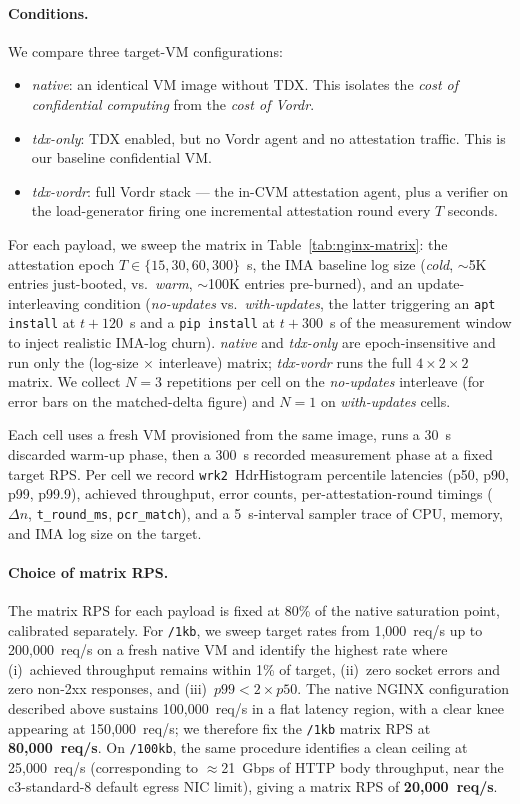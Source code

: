 \paragraph{Conditions.}
We compare three target-VM configurations:
\begin{itemize}
\item \emph{native}: an identical VM image without TDX. This isolates
  the \emph{cost of confidential computing} from the \emph{cost of
  Vordr}.
\item \emph{tdx-only}: TDX enabled, but no Vordr agent and no
  attestation traffic. This is our baseline confidential VM.
\item \emph{tdx-vordr}: full Vordr stack — the in-CVM attestation
  agent, plus a verifier on the load-generator firing one incremental
  attestation round every $T$ seconds.
\end{itemize}

For each payload, we sweep the matrix in
Table~\ref{tab:nginx-matrix}: the attestation epoch $T \in \{15, 30,
60, 300\}$~s, the IMA baseline log size (\emph{cold}, $\sim$5K entries
just-booted, vs.~\emph{warm}, $\sim$100K entries pre-burned), and an
update-interleaving condition (\emph{no-updates} vs.~\emph{with-updates},
the latter triggering an \texttt{apt install} at $t{+}120$~s and a
\texttt{pip install} at $t{+}300$~s of the measurement window to
inject realistic IMA-log churn). \emph{native} and \emph{tdx-only}
are epoch-insensitive and run only the (log-size $\times$ interleave)
matrix; \emph{tdx-vordr} runs the full $4 \times 2 \times 2$ matrix.
We collect $N{=}3$ repetitions per cell on the \emph{no-updates} interleave
(for error bars on the matched-delta figure) and $N{=}1$ on
\emph{with-updates} cells.

Each cell uses a fresh VM provisioned from the same image, runs a
30~s discarded warm-up phase, then a 300~s recorded measurement phase
at a fixed target RPS. Per cell we record \texttt{wrk2}~HdrHistogram
percentile latencies (p50, p90, p99, p99.9), achieved throughput,
error counts, per-attestation-round timings ($\Delta n$,
\texttt{t\_round\_ms}, \texttt{pcr\_match}), and a 5~s-interval
sampler trace of CPU, memory, and IMA log size on the target.

\paragraph{Choice of matrix RPS.}
The matrix RPS for each payload is fixed at 80\% of the native
saturation point, calibrated separately. For \texttt{/1kb}, we sweep
target rates from 1{,}000~req/s up to 200{,}000~req/s on a fresh
native VM and identify the highest rate where (i)~achieved throughput
remains within 1\% of target, (ii)~zero socket errors and zero
non-2xx responses, and (iii)~$p99 < 2 \times p50$. The native NGINX
configuration described above sustains 100{,}000~req/s in a flat
latency region, with a clear knee appearing at 150{,}000~req/s; we
therefore fix the \texttt{/1kb} matrix RPS at \textbf{80{,}000~req/s}.
On \texttt{/100kb}, the same procedure identifies a clean ceiling at
25{,}000~req/s (corresponding to $\approx$21~Gbps of HTTP body
throughput, near the c3-standard-8 default egress NIC limit), giving
a matrix RPS of \textbf{20{,}000~req/s}.

